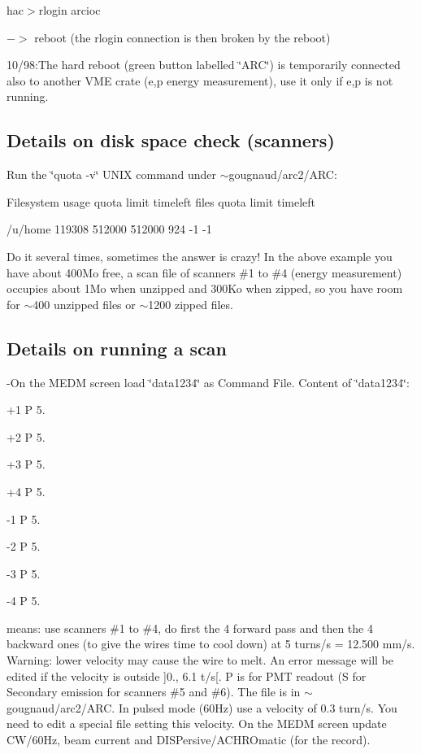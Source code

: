 hac$>$rlogin arcioc 

$->$ reboot (the rlogin connection is then broken by the reboot) 

10/98:The hard reboot (green button labelled \char`\"{}ARC\char`\"{}) is temporarily
connected also to another VME crate (e,p energy measurement), use it only if
e,p is not running. 


\subsection{Details on disk space check (scanners) }

Run the \char`\"{}quota -v\char`\"{} UNIX command under \( \sim  \)gougnaud/arc2/ARC: 

Filesystem usage quota limit timeleft files quota limit timeleft 

/u/home 119308 512000 512000 924 -1 -1 

Do it several times, sometimes the answer is crazy! In the above example you
have about 400Mo free, a scan file of scanners \#1 to \#4 (energy measurement)
occupies about 1Mo when unzipped and 300Ko when zipped, so you have room for
\( \sim  \)400 unzipped files or \( \sim  \)1200 zipped files. 


\subsection{Details on running a scan }

-On the MEDM screen load \char`\"{}data1234\char`\"{} as Command File. Content
of \char`\"{}data1234\char`\"{}: 

+1 P 5. 

+2 P 5. 

+3 P 5. 

+4 P 5. 

-1 P 5. 

-2 P 5. 

-3 P 5. 

-4 P 5. 

means: use scanners \#1 to \#4, do first the 4 forward pass and then the 4 backward
ones (to give the wires time to cool down) at 5 turns/s = 12.500 mm/s. Warning:
lower velocity may cause the wire to melt. An error message will be edited if
the velocity is outside {]}0., 6.1 t/s{[}. P is for PMT readout (S for Secondary
emission for scanners \#5 and \#6). The file is in \( \sim  \)gougnaud/arc2/ARC.
In pulsed mode (60Hz) use a velocity of 0.3 turn/s. You need to edit a special
file setting this velocity. On the MEDM screen update CW/60Hz, beam current
and DISPersive/ACHROmatic (for the record). 

